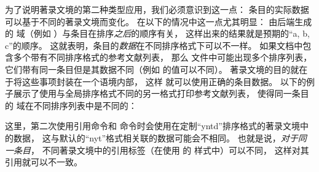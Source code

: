 为了说明著录文境的第二种类型应用，我们必须意识到这一点：
条目的实际数据可以基于不同的著录文境而变化。
在以下的情况中这一点尤其明显：
由后端生成的  域（例如 ）与条目在排序\emph{之后}的顺序有关，
这样出来的结果就是预期的“a, b, c”的顺序。
这就表明，条目的\emph{数据}在不同排序格式下可以不一样。
如果文档中包含多个带有不同排序格式的参考文献列表，
那么  文件中可能出现多个排序列表，它们带有同一条目但是其数据不同（例如  的值可以不同）。
著录文境的目的就在于将这些事项封装在一个语境内部，
这样 \biblatex 就可以使用正确的条目数据。
以下的例子展示了使用与全局排序格式不同的另一格式打印参考文献列表，
使得同一条目的  域在不同排序列表中是不同的：

\begin{ltxexample}
\usepackage[sorting=nyt,style=authoryear]{biblatex}

\cite{one}
\cite{two}
\printbibliography
\newrefcontext[sorting=yntd]
\cite{one}
\cite{two}
\printbibliography
\end{ltxexample}
%
这里，第二次使用引用命令和  命令时会使用在定制“yntd”排序格式的著录文境中的数据，
这与默认的“nyt”格式相关联的数据可能会不相同。
也就是说，\emph{对于同一条目}，
不同著录文境中的引用标签（在使用  的  样式中）可以不同，
这样对其引用就可以不一致。

